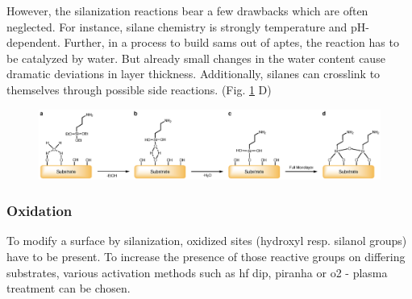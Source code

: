 However, the silanization reactions bear a few drawbacks which are often neglected. For instance, silane chemistry is strongly temperature and pH-dependent. \cite{lit:chem:silaizationTemp,lit:chem:silanizationParameters} Further, in a process to build \glspl{sam} out of \gls{aptes}, the reaction has to be catalyzed by water. But already small changes in the water content cause dramatic deviations in layer thickness. \cite{lit:chem:sin:selectivemod} Additionally, silanes can crosslink to themselves through possible side reactions. (Fig. \ref{fig:chem:APTES} D) \cite{lit:chem:aptes:Crosslink}
\begin{figure}[t!]
	\centering
	\includegraphics[width=1\linewidth]{./Ressources/Chemistry/APTES.eps}
	\label{fig:chem:APTES}
\end{figure}

\subsubsection{Oxidation}
To modify a surface by silanization, oxidized sites (\gls{hydroxyl} resp. \gls{silanol} groups) have to be present. To increase the presence of those reactive groups on differing substrates, various activation methods such as \gls{hf} dip,  \gls{piranha} or \gls{o2} - plasma treatment can be chosen. \cite{lit:chem:sin:etchingandchemical}

